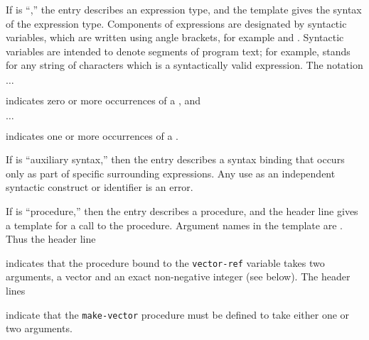 If  is ``\exprtype,'' the entry describes an expression
type, and the template gives the syntax of the expression type.
Components of expressions are designated by syntactic variables, which
are written using angle brackets, for example  and
.  Syntactic variables are intended to denote segments of
program text; for example,  stands for any string of
characters which is a syntactically valid expression.  The notation
\begin{tabbing}
\qquad {} $\ldots$
\end{tabbing}
indicates zero or more occurrences of a , and
\begin{tabbing}
\qquad {}  $\ldots$
\end{tabbing}
indicates one or more occurrences of a .

If  is ``auxiliary syntax,'' then the entry describes a
syntax binding that occurs only as part of specific surrounding
expressions. Any use as an independent syntactic construct or
identifier is an error.

If  is ``procedure,'' then the entry describes a procedure, and
the header line gives a template for a call to the procedure.  Argument
names in the template are .  Thus the header line

\noindent{}\unpenalty

indicates that the procedure bound to the {\tt vector-ref} variable takes
two arguments, a vector  and an exact non-negative integer
 (see below).  The header lines

\noindent%
\unpenalty

indicate that the {\tt make-vector} procedure must be defined to take
either one or two arguments.

